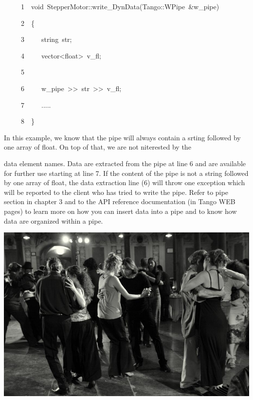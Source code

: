 
\begin{lyxcode}
~~~~~1~~void~StepperMotor::write\_DynData(Tango::WPipe~\&w\_pipe)

~~~~~2~~\{

~~~~~3~~~~~string~str;

~~~~~4~~~~~vector<float>~v\_fl;

~~~~~5

~~~~~6~~~~~w\_pipe~>\textcompwordmark{}>~str~>\textcompwordmark{}>~v\_fl;

~~~~~7~~~~~.....

~~~~~8~~\}
\end{lyxcode}


In this example, we know that the pipe will always contain a srting
followed by one array of float. On top of that, we are not niterested
by the

data element names. Data are extracted from the pipe at line 6 and
are available for further use starting at line 7. If the content of
the pipe is not a string followed by one array of float, the data
extraction line (6) will throw one exception which will be reported
to the client who has tried to write the pipe. Refer to pipe section
in chapter 3 and to the API reference documentation (in Tango WEB
pages) to learn more on how you can insert data into a pipe and to
know how data are organized within a pipe.

\bigskip{}

\begin{center}

\label{BlackPicture}\includegraphics[scale=0.6]{dance/tango-08-39}

\end{center}
